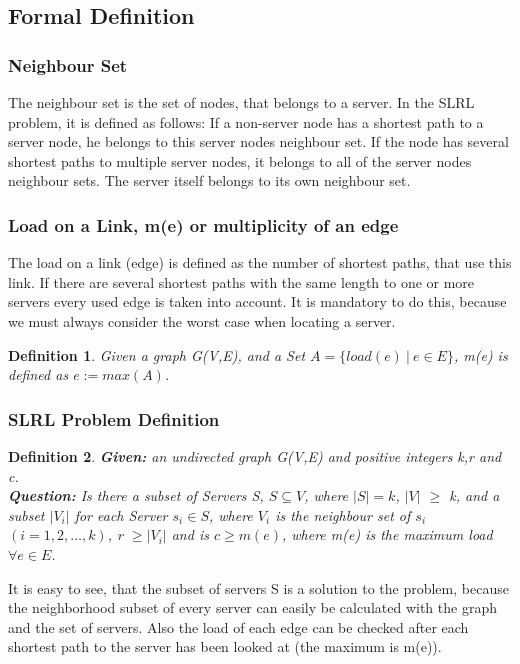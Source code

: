 \documentclass [12pt]{article}
\newtheorem{mydef}{Definition}
\begin{document}
\subsection{Formal Definition}
\subsubsection{Neighbour Set}
The neighbour set is the set of nodes, that belongs to a server. In the SLRL problem, it is
defined as follows: If a non-server node has a shortest path to a server node, he 
belongs to this server nodes neighbour set. If the node has several shortest
paths to multiple server nodes, it belongs to all of the server nodes neighbour
sets. The server itself belongs to its own neighbour set.
\subsubsection{Load on a Link, m(e) or multiplicity of an edge}
The load on a link (edge) is defined as the number of shortest paths, that use this link. If there
are several shortest paths with the same length to one or more servers every
used edge is taken into account. It is mandatory to do this, because we must always consider
the worst case when locating a server. 
\begin{mydef}
  Given a graph G(V,E), and a Set $A= \{ load(e) \ | \ e \in E \}$, m(e) is defined as $e:= max(A)$.
\end{mydef}
\subsubsection{SLRL Problem Definition}

\begin{mydef}
  {\itshape \textbf{Given:} an undirected graph G(V,E) and  positive integers k,r and c.\\
    \textbf{Question:} 
    Is there a subset of Servers S, $S \subseteq V$, where $|S| = k$, $|V|$ $\geq$ k,
    and a subset $|V_i|$ for each Server $s_i \in S$, where $V_i$ is the neighbour set of $s_i$ $(i=1,2,\dots,k)$, r $\geq  |V_i|$ 
  and is $c \geq m(e)$, where m(e) is the maximum load $\forall e \in E$.} 

\end{mydef}

It is easy to see, that the subset of servers S is a solution to the problem, because the neighborhood subset
of every server can easily be calculated with the graph and the set of servers. Also the load of each edge
can be checked after each shortest path to the server has been looked at (the maximum is m(e)).
\end{document}
